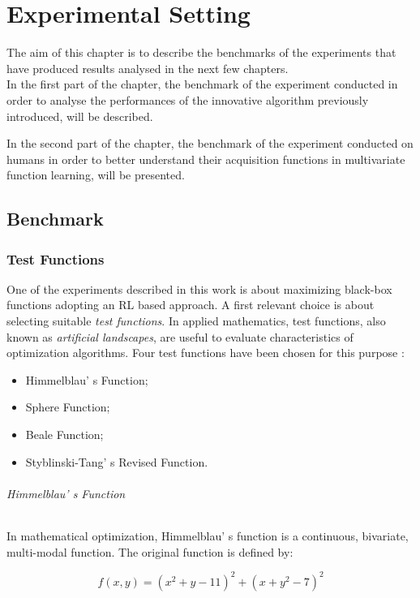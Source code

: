 \chapter{Experimental Setting}

The aim of this chapter is to describe the benchmarks of the experiments that have produced results analysed in the next few chapters. \\

In the first part of the chapter, the benchmark of the experiment conducted in order to analyse the performances of the innovative algorithm previously introduced, will be described. 

In the second part of the chapter, the benchmark of the experiment conducted on humans in order to better understand their acquisition functions in multivariate function learning, will be presented.

\section{Benchmark}

\subsection{Test Functions}

One of the experiments described in this work is about maximizing black-box functions adopting an RL based approach. A first relevant choice is about selecting suitable \textit{test functions}. In applied mathematics, test functions, also known as \textit{artificial landscapes}, are useful to evaluate characteristics of optimization algorithms. Four test functions have been chosen for this purpose :

\begin{itemize}
	\item Himmelblau' s Function;
	\item Sphere Function;
	\item Beale Function;
	\item Styblinski-Tang' s Revised Function.	
\end{itemize}

\subparagraph{Himmelblau' s Function} In mathematical optimization, Himmelblau' s function is a continuous, bivariate, multi-modal function. The original function is defined by: 

\begin{equation}
	f(x, y) = (x^2 + y -11)^2 + (x + y^2 - 7)^2
\end{equation}

